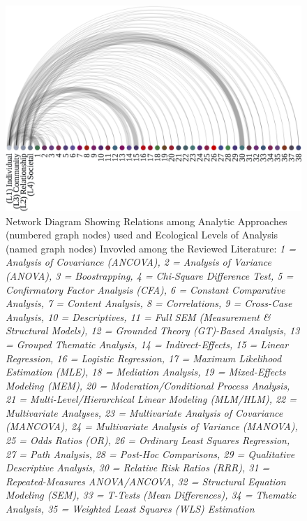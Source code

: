 \documentclass[11pt,]{tufte-book}
\begin{document}
\newpage

\begin{figure}
\centering
\includegraphics{graphics/inputs/arc_analyses.png}
\caption{Network Diagram Showing Relations among Analytic Approaches
(numbered graph nodes) used and Ecological Levels of Analysis (named
graph nodes) Invovled among the Reviewed Literature:
\textit{1 = Analysis of Covariance (ANCOVA), 2 = Analysis of Variance (ANOVA), 3 = Boostrapping, 4 = Chi-Square Difference Test, 5 = Confirmatory Factor Analysis (CFA), 6 = Constant Comparative Analysis, 7 = Content Analysis, 8 = Correlations, 9 = Cross-Case Analysis, 10 = Descriptives, 11 = Full SEM (Measurement \& Structural Models), 12 = Grounded Theory (GT)-Based Analysis, 13 = Grouped Thematic Analysis, 14 = Indirect-Effects, 15 = Linear Regression, 16 = Logistic Regression, 17 = Maximum Likelihood Estimation (MLE), 18 = Mediation Analysis, 19 = Mixed-Effects Modeling (MEM), 20 = Moderation/Conditional Process Analysis, 21 = Multi-Level/Hierarchical Linear Modeling (MLM/HLM), 22 = Multivariate Analyses, 23 = Multivariate Analysis of Covariance (MANCOVA), 24 = Multivariate Analysis of Variance (MANOVA), 25 = Odds Ratios (OR), 26 = Ordinary Least Squares Regression, 27 = Path Analysis, 28 = Post-Hoc Comparisons, 29 = Qualitative Descriptive Analysis, 30 = Relative Risk Ratios (RRR), 31 = Repeated-Measures ANOVA/ANCOVA, 32 = Structural Equation Modeling (SEM), 33 = T-Tests (Mean Differences), 34 = Thematic Analysis, 35 = Weighted Least Squares (WLS) Estimation}\label{fig:arc_analyses}}
\end{figure}

\newpage
\end{document}
